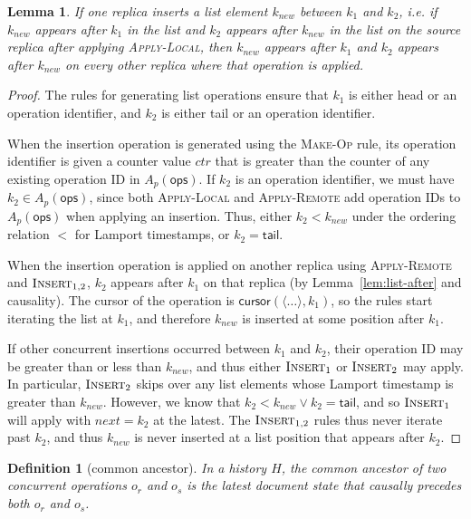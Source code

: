 \documentclass[10pt,journal,compsoc]{IEEEtran}
\newtheorem{definition}{Definition}
\newtheorem{lemma}[theorem]{Lemma}
\begin{document}
\begin{lemma}\label{lem:insert-between}
If one replica inserts a list element $k_\mathit{new}$ between $k_1$ and $k_2$, i.e. if $k_\mathit{new}$ appears after $k_1$ in the list and $k_2$ appears after $k_\mathit{new}$ in the list on the source replica after applying \textsc{Apply-Local}, then $k_\mathit{new}$ appears after $k_1$ and $k_2$ appears after $k_\mathit{new}$ on every other replica where that operation is applied.
\end{lemma}

\begin{proof}
The rules for generating list operations ensure that $k_1$ is either \textsf{head} or an operation identifier, and $k_2$ is either \textsf{tail} or an operation identifier.

When the insertion operation is generated using the \textsc{Make-Op} rule, its operation identifier is given a counter value $\mathit{ctr}$ that is greater than the counter of any existing operation ID in $A_p(\mathsf{ops})$. If $k_2$ is an operation identifier, we must have $k_2 \in A_p(\mathsf{ops})$, since both \textsc{Apply-Local} and \textsc{Apply-Remote} add operation IDs to $A_p(\mathsf{ops})$ when applying an insertion. Thus, either $k_2 < k_\mathit{new}$ under the ordering relation $<$ for Lamport timestamps, or $k_2 = \mathsf{tail}$.

When the insertion operation is applied on another replica using \textsc{Apply-Remote} and $\textsc{Insert}_{1,2}$, $k_2$ appears after $k_1$ on that replica (by Lemma~\ref{lem:list-after} and causality). The cursor of the operation is $\mathsf{cursor}(\langle\dots\rangle, k_1)$, so the rules start iterating the list at $k_1$, and therefore $k_\mathit{new}$ is inserted at some position after $k_1$.

If other concurrent insertions occurred between $k_1$ and $k_2$, their operation ID may be greater than or less than $k_\mathit{new}$, and thus either $\textsc{Insert}_1$ or $\textsc{Insert}_2$ may apply. In particular, $\textsc{Insert}_2$ skips over any list elements whose Lamport timestamp is greater than $k_\mathit{new}$. However, we know that $k_2 < k_\mathit{new} \vee k_2 = \mathsf{tail}$, and so $\textsc{Insert}_1$ will apply with $\mathit{next}=k_2$ at the latest. The $\textsc{Insert}_{1,2}$ rules thus never iterate past $k_2$, and thus $k_\mathit{new}$ is never inserted at a list position that appears after $k_2$.
\end{proof}

\begin{definition}[common ancestor]\label{def:common-ancestor}
In a history $H$, the \emph{common ancestor} of two concurrent operations $o_r$ and $o_s$ is the latest document state that causally precedes both $o_r$ and $o_s$.
\end{definition}
\end{document}
